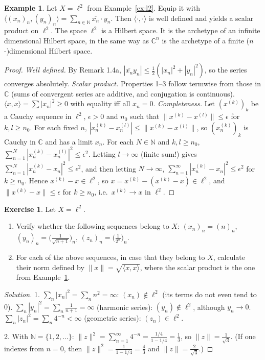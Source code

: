 \documentclass[11pt,a4paper]{article}
\numberwithin{equation}{section}
\newcommand{\N}{\mathbb{N}}
\newcommand{\C}{\mathbb{C}}
\newcommand{\ip}[2]{\langle #1, #2\rangle}
\newcommand{\conj}[1]{\overline{#1}}
\theoremstyle{plain}
\theoremstyle{definition}
\newtheorem{example}[theorem]{Example}
\newtheorem{exercise}[theorem]{Exercise}
\theoremstyle{plain}
\theoremstyle{definition}
\newenvironment{solution}{\begin{proof}[Solution]}{\end{proof}}
\begin{document}
\begin{example}\label{ex:l2sp}
Let $X=\ell^2$ from Example~\ref{ex:l2}. Equip it with
$\ip{(x_n)_n}{(y_n)_n}=\sum_{n\in\N}\conj{x_n}\cdot y_n$. Then $\ip{\cdot}{\cdot}$ is well
defined and yields a scalar product on $\ell^2$. The space $\ell^2$ is a Hilbert space. It
is the archetype of an infinite dimensional Hilbert space, in the same way as $\C^n$ is the
archetype of a finite ($n$-)dimensional Hilbert space.
\end{example}
\begin{proof}
\emph{Well defined.} By Remark 1.4a,
$|\conj{x_n}y_n|\le\frac12(|x_n|^2+|y_n|^2)$, so the series converges absolutely.
\emph{Scalar product.} Properties 1--3 follow termwise from those in $\C$ (sums of
convergent series are additive, and conjugation is continuous). $\ip{x}{x}=\sum|x_n|^2\ge0$
with equality iff all $x_n=0$.
\emph{Completeness.} Let $(x^{(k)})_k$ be a Cauchy sequence in $\ell^2$, $\epsilon>0$ and
$n_0$ such that $\|x^{(k)}-x^{(l)}\|\le\epsilon$ for $k,l\ge n_0$. For each fixed $n$,
$|x^{(k)}_n-x^{(l)}_n|\le\|x^{(k)}-x^{(l)}\|$, so $(x_n^{(k)})_k$ is Cauchy in $\C$ and has
a limit $x_n$. For each $N\in\N$ and $k,l\ge n_0$,
$\sum_{n=1}^N|x^{(k)}_n-x^{(l)}_n|^2\le\epsilon^2$. Letting $l\to\infty$ (finite sum!)
gives $\sum_{n=1}^N|x^{(k)}_n-x_n|^2\le\epsilon^2$, and then letting $N\to\infty$,
$\sum_{n=1}^\infty|x^{(k)}_n-x_n|^2\le\epsilon^2$ for $k\ge n_0$. Hence
$x^{(k)}-x\in\ell^2$, so $x=x^{(k)}-(x^{(k)}-x)\in\ell^2$, and $\|x^{(k)}-x\|\le\epsilon$
for $k\ge n_0$, i.e.\ $x^{(k)}\to x$ in $\ell^2$.
\end{proof}

\begin{exercise}
Let $X=\ell^2$.
\begin{enumerate}
\item Verify whether the following sequences belong to $X$:
$(x_n)_n=(n)_n$, $(y_n)_n=\big(\frac1{\sqrt{n+1}}\big)_n$, $(z_n)_n=\big(\frac1{2^n}\big)_n$.
\item For each of the above sequences, in case that they belong to $X$, calculate their
norm defined by $\|x\|=\sqrt{\ip{x}{x}}$, where the scalar product is the one from
Example~\ref{ex:l2sp}.
\end{enumerate}
\end{exercise}
\begin{solution}
1. $\sum_n|x_n|^2=\sum_nn^2=\infty$: $(x_n)\notin\ell^2$ (its terms do not even tend to $0$).
$\sum_n|y_n|^2=\sum_n\frac1{n+1}=\infty$ (harmonic series): $(y_n)\notin\ell^2$, although
$y_n\to0$. $\sum_n|z_n|^2=\sum_n4^{-n}<\infty$ (geometric series): $(z_n)\in\ell^2$.

2. With $\N=\{1,2,\dots\}$: $\|z\|^2=\sum_{n=1}^\infty4^{-n}=\frac{1/4}{1-1/4}=\frac13$, so
$\|z\|=\frac1{\sqrt3}$. (If one indexes from $n=0$, then $\|z\|^2=\frac1{1-1/4}=\frac43$ and
$\|z\|=\frac2{\sqrt3}$.)
\end{solution}
\end{document}

